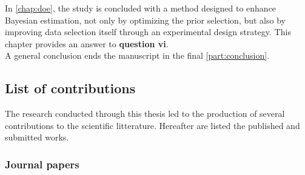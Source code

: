 \noindent
In \cref{chap:doe}, the study is concluded with a method designed to enhance Bayesian estimation, not only by optimizing the prior selection, but also by improving data selection itself through an experimental design strategy. This chapter provides an answer to \textbf{question vi}.\\

A general conclusion ends the manuscript in the final \cref{part:conclusion}.



\subsection{List of contributions}


The research conducted through this thesis led to the production of several contributions to the scientific litterature. Hereafter are listed the published and submitted works.



\subsubsection{Journal papers}



